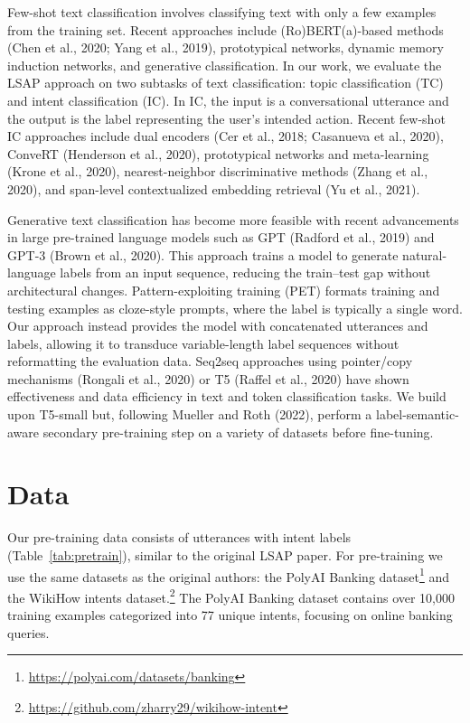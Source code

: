 \documentclass[11pt]{article}
\begin{document}
Few-shot text classification involves classifying text with only a few
examples from the training set. Recent approaches include
(Ro)BERT(a)-based methods (Chen et al., 2020; Yang et al., 2019),
prototypical networks, dynamic memory induction networks, and generative
classification. In our work, we evaluate the LSAP approach on two subtasks
of text classification: topic classification (TC) and intent classification
(IC). In IC, the input is a conversational utterance and the output is the
label representing the user's intended action. Recent few-shot IC approaches
include dual encoders (Cer et al., 2018; Casanueva et al., 2020), ConveRT
(Henderson et al., 2020), prototypical networks and meta-learning (Krone et
al., 2020), nearest-neighbor discriminative methods (Zhang et al., 2020),
and span-level contextualized embedding retrieval (Yu et al., 2021).

Generative text classification has become more feasible with recent
advancements in large pre-trained language models such as GPT (Radford et
al., 2019) and GPT-3 (Brown et al., 2020). This approach trains a model to
generate natural-language labels from an input sequence, reducing the
train--test gap without architectural changes. Pattern-exploiting training
(PET) formats training and testing examples as cloze-style prompts, where
the label is typically a single word. Our approach instead provides the
model with concatenated utterances and labels, allowing it to transduce
variable-length label sequences without reformatting the evaluation data.
Seq2seq approaches using pointer/copy mechanisms (Rongali et al., 2020) or
T5 (Raffel et al., 2020) have shown effectiveness and data efficiency in
text and token classification tasks. We build upon T5-small but, following
Mueller and Roth (2022), perform a label-semantic-aware secondary
pre-training step on a variety of datasets before fine-tuning.

\section{Data}
\label{sec:data}

Our pre-training data consists of utterances with intent labels
(Table~\ref{tab:pretrain}), similar to the original LSAP paper. For
pre-training we use the same datasets as the original authors: the PolyAI
Banking dataset\footnote{\url{https://polyai.com/datasets/banking}} and the
WikiHow intents
dataset.\footnote{\url{https://github.com/zharry29/wikihow-intent}} The
PolyAI Banking dataset contains over 10,000 training examples categorized
into 77 unique intents, focusing on online banking queries.
\end{document}
